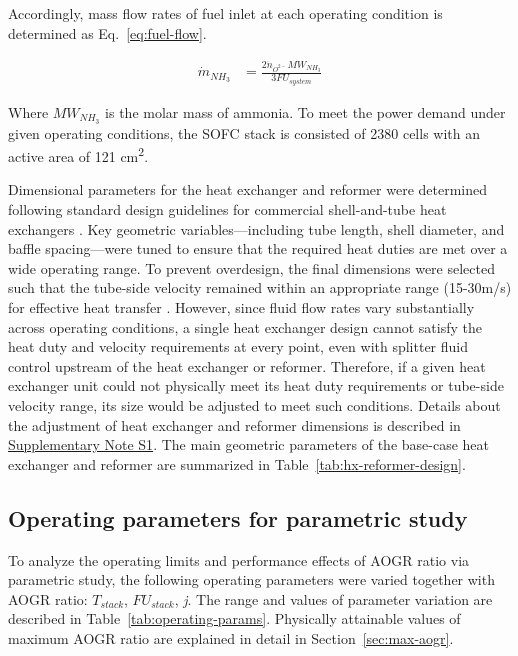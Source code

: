 \documentclass[a4paper,10pt]{cas-dc} %
\begin{document}
Accordingly, mass flow rates of fuel inlet at each operating condition is determined as Eq.~\eqref{eq:fuel-flow}.

\begin{align}
{\dot{m}}_{{NH}_{3}} &= \frac{2{\dot{n}}_{O^{2 -}}{MW}_{{NH}_{3}}}{3{FU}_{system}} \label{eq:fuel-flow}
\end{align}

Where \({MW}_{{NH}_{3}}\) is the molar mass of ammonia. 
To meet the power demand under given operating conditions, the SOFC stack is consisted of 2380 cells with an active area of 121 cm\textsuperscript{2}.

Dimensional parameters for the heat exchanger and reformer were determined following standard design guidelines for commercial shell-and-tube heat exchangers \cite{thulukkanam2000heat,kakacc2002heat, thome2006wolverine}.
Key geometric variables---including tube length, shell diameter, and baffle spacing---were tuned to ensure that the required heat duties are met over a wide operating range.
To prevent overdesign, the final dimensions were selected such that the tube-side velocity remained within an appropriate range (15-30m/s) for effective heat transfer \cite{edwards2008design}.
However, since fluid flow rates vary substantially across operating conditions, a single heat exchanger design cannot satisfy the heat duty and velocity requirements at every point, even with splitter fluid control upstream of the heat exchanger or reformer.
Therefore, if a given heat exchanger unit could not physically meet its heat duty requirements or tube-side velocity range, its size would be adjusted to meet such conditions.
Details about the adjustment of heat exchanger and reformer dimensions is described in \href{Supplementary.pdf}{Supplementary Note S1}.
The main geometric parameters of the base-case heat exchanger and reformer are summarized in Table~\ref{tab:hx-reformer-design}.

\subsection{Operating parameters for parametric study}

To analyze the operating limits and performance effects of AOGR ratio via parametric study, the following operating parameters were varied together with AOGR ratio: \(T_{stack}\), \({FU}_{stack}\), \emph{j}.
The range and values of parameter variation are described in Table~\ref{tab:operating-params}.
Physically attainable values of maximum AOGR ratio are explained in detail in Section~\ref{sec:max-aogr}.
\end{document}
